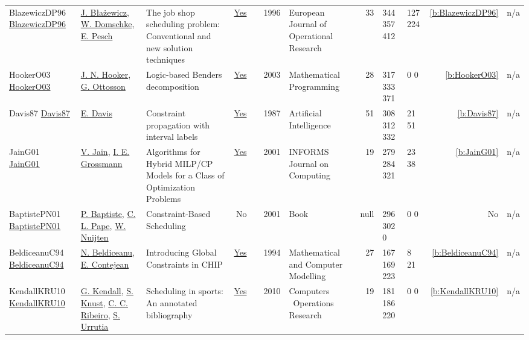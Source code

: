 {\begin{longtable}{>{\raggedright\arraybackslash}p{3cm}>{\raggedright\arraybackslash}p{4.5cm}>{\raggedright\arraybackslash}p{6.0cm}rrrp{2.5cm}rp{1cm}p{1cm}rr}
BlazewiczDP96 \href{http://dx.doi.org/10.1016/0377-2217(95)00362-2}{BlazewiczDP96} & \hyperref[auth:a976]{J. Błażewicz}, \hyperref[auth:a977]{W. Domschke}, \hyperref[auth:a438]{E. Pesch} & The job shop scheduling problem: Conventional and new solution techniques & \href{../works/BlazewiczDP96.pdf}{Yes} & \cite{BlazewiczDP96} & 1996 & European Journal of Operational Research & 33 & 344 357 412 & 127 224 & \ref{b:BlazewiczDP96} & n/a\\
HookerO03 \href{http://dx.doi.org/10.1007/s10107-003-0375-9}{HookerO03} & \hyperref[auth:a160]{J. N. Hooker}, \hyperref[auth:a852]{G. Ottosson} & \cellcolor{green!10}Logic-based Benders decomposition & \href{../works/HookerO03.pdf}{Yes} & \cite{HookerO03} & 2003 & Mathematical Programming & 28 & 317 333 371 & 0 0 & \ref{b:HookerO03} & n/a\\
Davis87 \href{http://dx.doi.org/10.1016/0004-3702(87)90091-9}{Davis87} & \hyperref[auth:a1216]{E. Davis} & \cellcolor{gold!20}Constraint propagation with interval labels & \href{../works/Davis87.pdf}{Yes} & \cite{Davis87} & 1987 & Artificial Intelligence & 51 & 308 312 332 & 21 51 & \ref{b:Davis87} & n/a\\
JainG01 \href{http://dx.doi.org/10.1287/ijoc.13.4.258.9733}{JainG01} & \hyperref[auth:a844]{V. Jain}, \hyperref[auth:a382]{I. E. Grossmann} & Algorithms for Hybrid MILP/CP Models for a Class of Optimization Problems & \href{../works/JainG01.pdf}{Yes} & \cite{JainG01} & 2001 & \cellcolor{red!20}INFORMS Journal on Computing & 19 & 279 284 321 & 23 38 & \ref{b:JainG01} & n/a\\
BaptistePN01 \href{http://dx.doi.org/10.1007/978-1-4615-1479-4}{BaptistePN01} & \hyperref[auth:a162]{P. Baptiste}, \hyperref[auth:a163]{C. L. Pape}, \hyperref[auth:a656]{W. Nuijten} & Constraint-Based Scheduling & No & \cite{BaptistePN01} & 2001 & Book & null & 296 302 0 & 0 0 & No & n/a\\
BeldiceanuC94 \href{https://www.sciencedirect.com/science/article/pii/0895717794901279}{BeldiceanuC94} & \hyperref[auth:a128]{N. Beldiceanu}, \hyperref[auth:a784]{E. Contejean} & \cellcolor{gold!20}Introducing Global Constraints in {CHIP} & \href{../works/BeldiceanuC94.pdf}{Yes} & \cite{BeldiceanuC94} & 1994 & Mathematical and Computer Modelling & 27 & 167 169 223 & 8 21 & \ref{b:BeldiceanuC94} & n/a\\
KendallKRU10 \href{http://dx.doi.org/10.1016/j.cor.2009.05.013}{KendallKRU10} & \hyperref[auth:a1388]{G. Kendall}, \hyperref[auth:a1167]{S. Knust}, \hyperref[auth:a1387]{C. C. Ribeiro}, \hyperref[auth:a1389]{S. Urrutia} & Scheduling in sports: An annotated bibliography & \href{../works/KendallKRU10.pdf}{Yes} & \cite{KendallKRU10} & 2010 & Computers \  Operations Research & 19 & 181 186 220 & 0 0 & \ref{b:KendallKRU10} & n/a\\

\end{longtable}}
